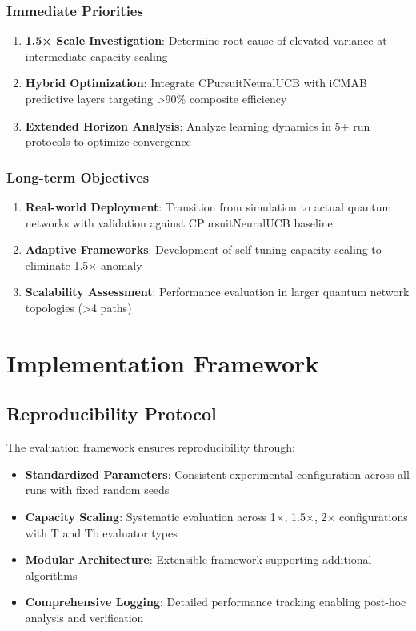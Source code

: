 \documentclass[12pt,a4paper]{article}
\begin{document}
\subsubsection{Immediate Priorities}
\begin{enumerate}
\item \textbf{1.5× Scale Investigation}: Determine root cause of elevated variance at intermediate capacity scaling
\item \textbf{Hybrid Optimization}: Integrate CPursuitNeuralUCB with iCMAB predictive layers targeting >90\% composite efficiency
\item \textbf{Extended Horizon Analysis}: Analyze learning dynamics in 5+ run protocols to optimize convergence
\end{enumerate}

\subsubsection{Long-term Objectives}
\begin{enumerate}
\item \textbf{Real-world Deployment}: Transition from simulation to actual quantum networks with validation against CPursuitNeuralUCB baseline
\item \textbf{Adaptive Frameworks}: Development of self-tuning capacity scaling to eliminate 1.5× anomaly
\item \textbf{Scalability Assessment}: Performance evaluation in larger quantum network topologies (>4 paths)
\end{enumerate}

\section{Implementation Framework}

\subsection{Reproducibility Protocol}

The evaluation framework ensures reproducibility through:

\begin{itemize}
\item \textbf{Standardized Parameters}: Consistent experimental configuration across all runs with fixed random seeds
\item \textbf{Capacity Scaling}: Systematic evaluation across 1×, 1.5×, 2× configurations with T and Tb evaluator types
\item \textbf{Modular Architecture}: Extensible framework supporting additional algorithms
\item \textbf{Comprehensive Logging}: Detailed performance tracking enabling post-hoc analysis and verification
\end{itemize}
\end{document}
